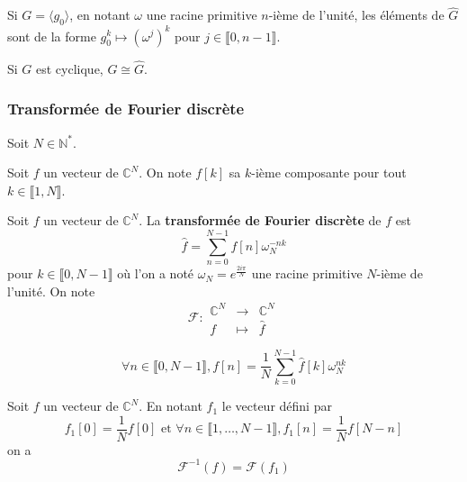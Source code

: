   \begin{proposition}
    Si $G = \langle g_0 \rangle$, en notant $\omega$ une racine primitive $n$-ième de l'unité, les éléments de $\widehat{G}$ sont de la forme $g_0^k \mapsto (\omega^j)^k$ pour $j \in \llbracket 0, n-1 \rrbracket$.
  \end{proposition}

  \begin{corollary}
    Si $G$ est cyclique, $G \cong \widehat{G}$.
  \end{corollary}

  \subsubsection{Transformée de Fourier discrète}


  Soit $N \in \mathbb{N}^*$.

  \begin{notation}
    Soit $f$ un vecteur de $\mathbb{C}^{N}$. On note $f[k]$ sa $k$-ième composante pour tout $k \in \llbracket 1, N \rrbracket$.
  \end{notation}

  \begin{definition}
    Soit $f$ un vecteur de $\mathbb{C}^{N}$.
    La \textbf{transformée de Fourier discrète} de $f$ est
    \[ \widehat{f} = \sum_{n=0}^{N-1} f[n] \omega_N^{-nk} \]
    pour $k \in \llbracket 0, N-1 \rrbracket$ où l'on a noté $\omega_N = e^{\frac{2i\pi}{N}}$ une racine primitive $N$-ième de l'unité.
    On note
    \[
    \mathcal{F} :
    \begin{array}{ccc}
      \mathbb{C}^{N} &\rightarrow& \mathbb{C}^{N} \\
      f &\mapsto& \widehat{f}
    \end{array}
    \]
  \end{definition}

  \begin{proposition}
    \[ \forall n \in \llbracket 0, N-1 \rrbracket, f[n] = \frac{1}{N} \sum_{k=0}^{N-1} \widehat{f}[k] \omega_N^{nk} \]
  \end{proposition}

  \begin{corollary}
    Soit $f$ un vecteur de $\mathbb{C}^{N}$. En notant $f_1$ le vecteur défini par
    \[ f_1[0] = \frac{1}{N} f[0] \text{ et } \forall n \in \llbracket 1, \dots, N-1 \rrbracket, f_1[n] = \frac{1}{N} f[N-n] \]
    on a
    \[ \mathcal{F}^{-1}(f) = \mathcal{F}(f_1) \]
  \end{corollary}

